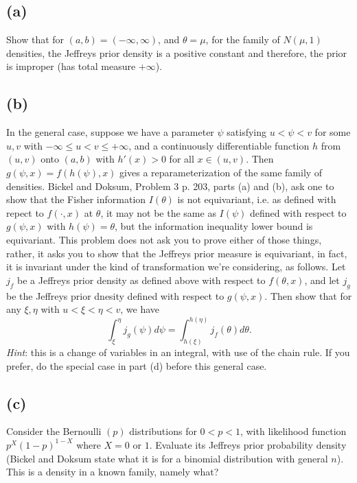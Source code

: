\documentclass[11pt]{article}
\newcommand{\ProbS}{\iftrue}
\newcommand{\ProbE}{\fi}
\begin{document}
\subsection*{(a)}
\ProbS
Show that for $(a,b) = (-\infty, \infty)$, and $\theta = \mu$, for the family of $N(\mu, 1)$ densities, the Jeffreys prior density is a positive constant and therefore, the prior is improper (has total measure $+\infty$).
\ProbE

\subsection*{(b)}
\ProbS
In the general case, suppose we have a parameter $\psi$ satisfying
$u < \psi < v$ for some $u,v$ with $-\infty \leq u < v \leq +\infty$,
and a continuously differentiable function $h$ from $(u,v)$ onto $(a,b)$ with $h'(x)>0$ for all $x \in (u,v)$.
Then $g(\psi, x) = f(h(\psi), x)$ gives a reparameterization of the same family of densities.
Bickel and Doksum, Problem 3 p. 203, parts (a) and (b), ask one to show that the Fisher information $I(\theta)$ is not equivariant, i.e. as defined with repect to $f(\cdot, x)$ at $\theta$, it may not be the same as $I(\psi)$ defined with respect to $g(\psi, x)$ with $h(\psi)=\theta$, but the information inequality lower bound is equivariant.
This problem does not ask you to prove either of those things, rather, it asks you to show that the Jeffreys prior measure is equivariant, in fact, it is invariant under the kind of transformation we're considering, as follows.
Let $j_f$ be a Jeffreys prior density as defined above with respect to $f(\theta, x)$, and let $j_g$ be the Jeffreys prior dnesity defined with respect to $g(\psi, x)$. Then show that for any $\xi, \eta$ with $u < \xi < \eta < v$, we have
$$
\int_{\xi}^{\eta} j_g(\psi)d\psi = \int_{h(\xi)}^{h(\eta)} j_f(\theta) d\theta.
$$
\emph{Hint}: this is a change of variables in an integral, with use of the chain rule. If you prefer, do the special case in part (d) before this general case.
\ProbE

\subsection*{(c)}
\ProbS
Consider the Bernoulli $(p)$ distributions for $0<p<1$, with likelihood function $p^X(1-p)^{1-X}$ where $X=0$ or $1$. Evaluate its Jeffreys prior probability density (Bickel and Doksum state what it is for a binomial distribution with general $n$). This is a density in a known family, namely what?
\ProbE
\end{document}
